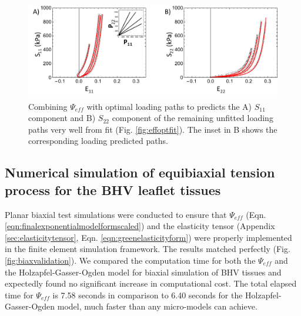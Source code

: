 \begin{figure}[hptb]
\centering
\includegraphics[width=6.5in]{Figures/effoptpred}
\caption{Combining $\Psi_{eff}$ with optimal loading paths to predicts the A) $S_{11}$ component and B) $S_{22}$ component of the remaining unfitted loading paths very well from fit (Fig. \ref{fig:effoptfit}). The inset in B shows the corresponding loading predicted paths.}
\label{fig:effoptpred}
\end{figure} 





	



\subsection{Numerical simulation of equibiaxial tension process for the BHV leaflet tissues}
	
    Planar biaxial test simulations were conducted to ensure that $\Psi_{eff}$ (Eqn. \ref{eqn:finalexponentialmodelformscaled}) and the elasticity tensor (Appendix \ref{sec:elasticitytensor}, Eqn. \ref{eqn:greenelasticityform}) were properly implemented in the finite element simulation framework. The results matched perfectly (Fig. \ref{fig:biaxvalidation}). We compared the computation time for both the $\Psi_{eff}$ and the Holzapfel-Gasser-Ogden model for biaxial simulation of BHV tissues and expectedly found no significant increase in computational cost. The total elapsed time for $\Psi_{eff}$ is 7.58 seconds in comparison to 6.40 seconds for the Holzapfel-Gasser-Ogden model, much faster than any micro-models can achieve.  


